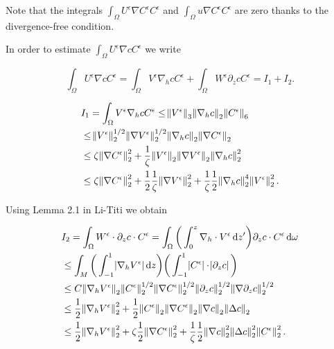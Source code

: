 \documentclass[11pt]{article}
\newcommand*\diff{\mathop{}\!\mathrm{d}}
\begin{document}
Note that the integrals $\int_\Omega U^\epsilon \nabla C^\epsilon C^\epsilon$ and $\int_\Omega u \nabla C^\epsilon C^\epsilon$ are zero thanks to the divergence-free condition.

In order to estimate $\int_\Omega U^\epsilon \nabla c C^\epsilon$ we write

$$ \int_\Omega U^\epsilon \nabla c C^\epsilon = \int_\Omega V^\epsilon \nabla_h c C^\epsilon + \int_\Omega W^\epsilon \partial_z c C^\epsilon = I_1 + I_2.$$

\begin{equation}
  \begin{split}
    & I_1 = \int_\Omega V^\epsilon \nabla_h c C^\epsilon \leq \norm{V^\epsilon}_3 \norm{\nabla_h c}_2 \norm{C^\epsilon}_6 \\
    & \leq \norm{V^\epsilon}_2^{1/2} \norm{\nabla V^\epsilon}_2^{1/2} \norm{\nabla_h c}_2 \norm{\nabla C^\epsilon}_2 \\
    & \leq \zeta \norm{\nabla C^\epsilon}_2^2 + \frac{1}{\zeta} \norm{V^\epsilon}_2 \norm{\nabla V^\epsilon}_2 \norm{\nabla_h c}_2^2 \\
    & \leq \zeta \norm{\nabla C^\epsilon}_2^2 + \frac{1}{2} \frac{1}{\zeta} \norm{\nabla V^\epsilon}_2^2 + \frac{1}{\zeta} \frac{1}{2} \norm{\nabla_h c}_2^4 \norm{V^\epsilon}_2^2.
  \end{split}
\end{equation}

Using Lemma 2.1 in Li-Titi we obtain

\begin{equation}
  \begin{split}
    & I_2 = \int_\Omega W^\epsilon \cdot \partial_z c \cdot C^\epsilon = \int_\Omega \bigg ( \int_0^z \nabla_h \cdot V^\epsilon \diff z' \bigg ) \partial_z c \cdot C^\epsilon \diff \omega\\
    & \leq \int_M \bigg ( \int_{-1}^1 \abs{ \nabla_h V^\epsilon } \diff z \bigg ) \bigg ( \int_{-1}^1 \abs{C^\epsilon} \cdot \abs{\partial_z c} \bigg ) \\
    & \leq C \norm{\nabla_h V^\epsilon}_2 \norm{C^\epsilon}_2^{1/2} \norm{ \nabla C^\epsilon}_2^{1/2} \norm{\partial_z c}_2^{1/2} \norm{\nabla \partial_z c}_2^{1/2} \\
    & \leq \frac{1}{2} \norm{\nabla_h V^\epsilon}_2^2 + \frac{1}{2} \norm{C^\epsilon}_2 \norm{ \nabla C^\epsilon}_2 \norm{\nabla c}_2 \norm{\Delta c}_2 \\
    & \leq \frac{1}{2} \norm{\nabla_h V^\epsilon}_2^2 + \zeta \frac{1}{2} \norm{ \nabla C^\epsilon}_2^2 + \frac{1}{\zeta} \frac{1}{2} \norm{\nabla c}_2^2 \norm{\Delta c}_2^2 \norm{C^\epsilon}_2^2.
  \end{split}
\end{equation}
\end{document}
